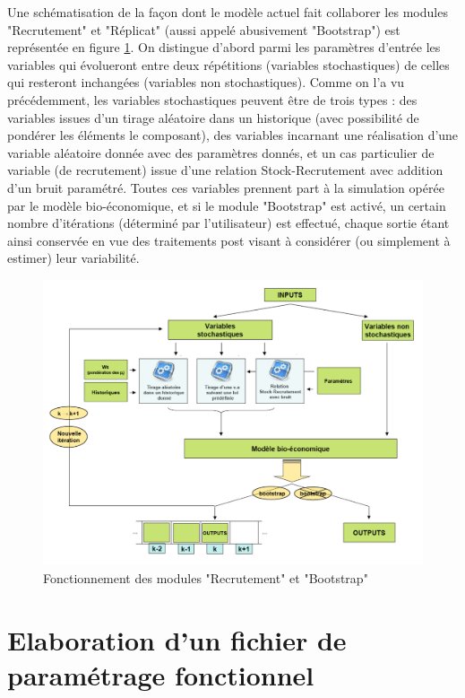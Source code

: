 \documentclass[12pt, colorinlistoftodos, notitlepage]{report}
\newenvironment{not used}[1]{%
    \longtable{%
        |>{\centering$\displaystyle}A{#1}{1}<{$}%
        |}\hline\ignorespaces}{%
    \endlongtable\ignorespacesafterend}
\begin{document}
Une schématisation de la façon dont le modèle actuel fait collaborer les modules "Recrutement" et "Réplicat" (aussi appelé abusivement "Bootstrap") est représentée en figure \ref{fig:recru_mod}. On distingue d'abord parmi les paramètres d'entrée les variables qui évolueront entre deux répétitions (variables stochastiques) de celles qui resteront inchangées (variables non stochastiques). Comme on l'a vu précédemment, les variables stochastiques peuvent être de trois types : des variables issues d'un tirage aléatoire dans un historique (avec possibilité de pondérer les éléments le composant), des variables incarnant une réalisation d'une variable aléatoire donnée avec des paramètres donnés, et un cas particulier de variable (de recrutement) issue d'une relation Stock-Recrutement avec addition d'un bruit paramétré. Toutes ces variables prennent part à la simulation opérée par le modèle bio-économique, et si le module "Bootstrap" est activé, un certain nombre d'itérations (déterminé par l'utilisateur) est effectué, chaque sortie étant ainsi conservée en vue des traitements post visant à considérer (ou simplement à estimer) leur variabilité.

\begin{figure}
\begin{center}
\includegraphics[width = 17cm]{figures/Recru_module.png}
\end{center}
\caption{Fonctionnement des modules "Recrutement" et "Bootstrap"}
\label{fig:recru_mod}
\end{figure}

\chapter{Elaboration d'un fichier de paramétrage fonctionnel} \label{chp:param}
\end{document}
